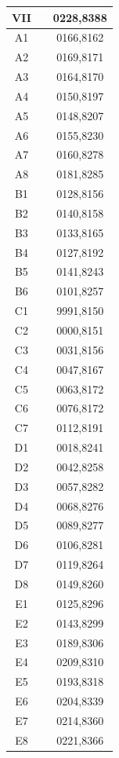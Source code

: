\documentclass[12pt,landscape]{article}
\begin{document}
\begin{multicols}{2}
\begin{tabular}{|c|c|c|}
	VII & & 0228,8388\\
	\hline
	A1 & & 0166,8162\\
	A2 & & 0169,8171\\
	A3 & & 0164,8170\\
	A4 & & 0150,8197\\
	A5 & & 0148,8207\\
	A6 & & 0155,8230\\
	A7 & & 0160,8278\\
	A8 & & 0181,8285\\
	\hline
	B1 & & 0128,8156\\
	B2 & & 0140,8158\\
	B3 & & 0133,8165\\
	B4 & & 0127,8192\\
	B5 & & 0141,8243\\
	B6 & & 0101,8257\\
	\hline
	C1 & & 9991,8150\\
	C2 & & 0000,8151\\
	C3 & & 0031,8156\\
	C4 & & 0047,8167\\
	C5 & & 0063,8172\\
	C6 & & 0076,8172\\
	C7 & & 0112,8191\\
	\hline
	D1 & & 0018,8241\\
	D2 & & 0042,8258\\
	D3 & & 0057,8282\\
	D4 & & 0068,8276\\
	D5 & & 0089,8277\\
	D6 & & 0106,8281\\
	D7 & & 0119,8264\\
	D8 & & 0149,8260\\
	\hline
	E1 & & 0125,8296\\
	E2 & & 0143,8299\\
	E3 & & 0189,8306\\
	E4 & & 0209,8310\\
	E5 & & 0193,8318\\
	E6 & & 0204,8339\\
	E7 & & 0214,8360\\
	E8 & & 0221,8366\\
	\hline
\end{tabular}

\end{multicols}
\end{document}
